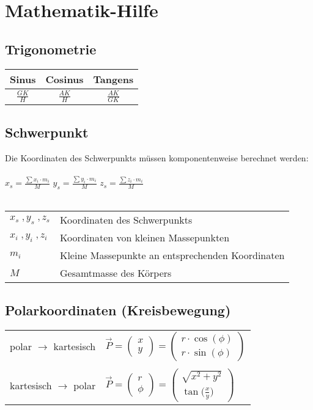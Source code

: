 \section{Mathematik-Hilfe}
		
	\subsection{Trigonometrie}
	\begin{tabular}{| c | c | c |}
	\hline
	Sinus & Cosinus & Tangens \\ 
	\hline 
	\rule{0pt}{10pt} $\frac{GK}{H}$ & $\frac{AK}{H}$ & $\frac{AK}{GK}$ \\ 
	\hline
	\end{tabular} 
		
		
		
	\subsection{Schwerpunkt}
	Die Koordinaten des Schwerpunkts müssen komponentenweise berechnet werden: \\
	\\
	$x_s = \frac{\sum  x_i \cdot m_i}{M}$ \qquad	$y_s = \frac{\sum  y_i \cdot m_i}{M}$ \qquad $z_s = \frac{\sum  z_i \cdot m_i}{M}$ \\
	\\
	\begin{tabular}{ll}
	$x_s \; , y_s \; , z_s$ & Koordinaten des Schwerpunkts \\
	$x_i \; , y_i \; , z_i$ & Koordinaten von kleinen Massepunkten \\
	$m_i$ & Kleine Massepunkte an entsprechenden Koordinaten \\
	$M$ & Gesamtmasse des Körpers
	\end{tabular}
	
	\subsection{Polarkoordinaten (Kreisbewegung)}

	
	\begin{tabular}{ll}
	polar $\rightarrow$ kartesisch & $\vec{P} =  \begin{pmatrix} x \\ y \end{pmatrix} =  \begin{pmatrix} r \cdot \cos(\phi)  \\ r \cdot \sin(\phi)  \end{pmatrix}$ \\
	\\
	kartesisch $\rightarrow$ polar & $\vec{P} =  \begin{pmatrix} r \\ \phi \end{pmatrix} =  \begin{pmatrix} \sqrt{x^2 + y^2}  \\ \tan \big( \frac{x}{y} \big)   \end{pmatrix}$\\
	\end{tabular}
	
